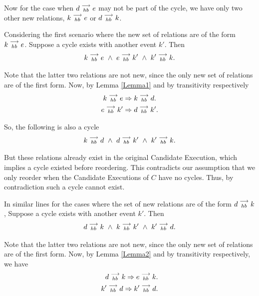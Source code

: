 
    Now for the case when $d\stackrel{\longrightarrow}{_{hb}}e$ may not be part of the cycle, we have only two other new relations, $k\stackrel{\longrightarrow}{_{hb}}e$ or $d\stackrel{\longrightarrow}{_{hb}}k$.

    Considering the first scenario where the new set of relations are of the form $k\stackrel{\longrightarrow}{_{hb}}e$. 
    Suppose a cycle exists with another event $k'$. Then 
    \[
        k\stackrel{\longrightarrow}{_{hb}}e \ \wedge \
        e\stackrel{\longrightarrow}{_{hb}}k' \ \wedge \
        k'\stackrel{\longrightarrow}{_{hb}}k.
    \]

    Note that the latter two relations are not new, since the only new set of relations are of the first form. Now, by Lemma \ref{Lemma1} and by transitivity respectively
    \begin{gather*}
        k\stackrel{\longrightarrow}{_{hb}}e \Rightarrow k\stackrel{\longrightarrow}{_{hb}}d. \\
        e\stackrel{\longrightarrow}{_{hb}}k' \Rightarrow d\stackrel{\longrightarrow}{_{hb}}k'.    
    \end{gather*}

    So, the following is also a cycle
    \[
        k\stackrel{\longrightarrow}{_{hb}}d \ \wedge \
        d\stackrel{\longrightarrow}{_{hb}}k' \ \wedge \
        k'\stackrel{\longrightarrow}{_{hb}}k.
    \]

    But these relations already exist in the original Candidate Execution, which implies a cycle existed before reordering. 
    This contradicts our assumption that we only reorder when the Candidate Executions of $C$ have no cycles. 
    Thus, by contradiction such a cycle cannot exist.

    In similar lines for the cases where the set of new relations are of the form $d\stackrel{\longrightarrow}{_{hb}}k$,  Suppose a cycle exists with another event $k'$. Then 
    \begin{align*}
        \reln{d}{hb}{k} \ \wedge \
        \reln{k}{hb}{k'} \ \wedge \ 
        \reln{k'}{hb}{d}. 
    \end{align*}

    Note that the latter two relations are not new, since the only new set of relations are of the first form. 
    Now, by Lemma \ref{Lemma2} and by transitivity respectively, we have 
    \begin{align*}
        d\stackrel{\longrightarrow}{_{hb}}k \Rightarrow e\stackrel{\longrightarrow}{_{hb}}k. \\
        k'\stackrel{\longrightarrow}{_{hb}}d \Rightarrow k'\stackrel{\longrightarrow}{_{hb}}d.
    \end{align*}

